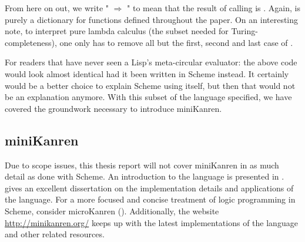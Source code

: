 From here on out, we write " $\Rightarrow$ " to mean that the result of calling  is . Again,  is purely a dictionary for functions defined throughout the paper. On an interesting note, to interpret pure lambda calculus (the subset needed for Turing-completeness), one only has to remove all but the first, second and last case of .

For readers that have never seen a Lisp's meta-circular evaluator: the above code would look almost identical had it been written in Scheme instead. It certainly would be a better choice to explain Scheme using itself, but then that would not be an explanation anymore. With this subset of the language specified, we have covered the groundwork necessary to introduce miniKanren.
\subsection{miniKanren}
Due to scope issues, this \ifthesis thesis \else report \fi will not cover miniKanren in as much detail as done with Scheme.
An introduction to the language is presented in \textcite{reasoned}.
\textcite{byrdphd} gives an excellent dissertation on the implementation details and applications of the language.
For a more focused and concise treatment of logic programming in Scheme, consider microKanren (\cite{micro}).
Additionally, the website \url{http://minikanren.org/} keeps up with the latest implementations of the language and other related resources.

